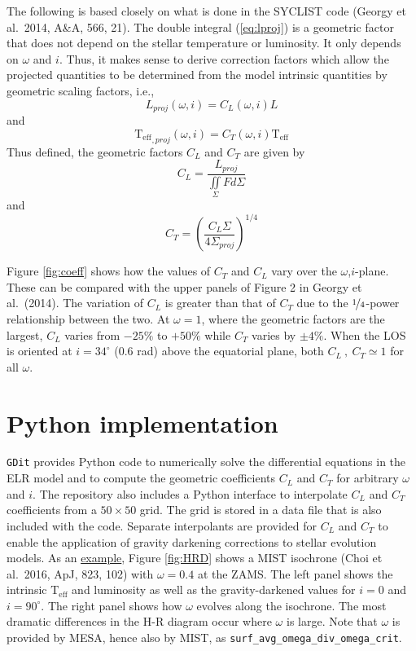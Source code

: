 \documentclass[12pt]{article}
\newcommand{\Teff}{\mathrm{T_{eff}}}
\begin{document}
The following is based closely on what is done in the SYCLIST code
(Georgy et al.\ 2014, A\&A, 566, 21). The double integral (\ref{eq:lproj}) is a
geometric factor that does not depend on the stellar temperature or luminosity.
It only depends on $\omega$ and $i$. Thus, it makes sense to derive correction
factors which allow the projected quantities to be determined from the model
intrinsic quantities by geometric scaling factors, i.e.,
\begin{equation}
  L_{proj}(\omega,i) = C_L(\omega,i) L
\end{equation}
and
\begin{equation}
  \Teff_{,proj}(\omega,i) = C_T(\omega,i) \Teff
\end{equation}
Thus defined, the geometric factors $C_L$ and $C_T$ are given by
\begin{equation}
C_L = \frac{L_{proj} }{\iint\limits_\Sigma F d\Sigma}
\end{equation}
and
\begin{equation}
C_T = \left( \frac{C_L \Sigma}{4 \Sigma_{proj}} \right)^{1/4}
\end{equation}

Figure \ref{fig:coeff} shows how the values of $C_T$ and $C_L$ vary over the
$\omega$,$i$-plane. These can be compared with the upper panels of Figure 2
in Georgy et al.\ (2014). The variation of $C_L$ is greater than that of $C_T$
due to the $\nicefrac{1}{4}$-power relationship between the two. At $\omega=1$, where
the geometric factors are the largest, $C_L$ varies from $-25\%$ to
$+50\%$ while $C_T$ varies by $\pm4\%$. When the LOS is oriented at
$i=34^{\circ}$ ($0.6$ rad) above the equatorial plane, both $C_L~,~C_T \simeq 1$
for all $\omega$.

\section{Python implementation}
\texttt{GDit} provides Python code to numerically solve the differential equations in the ELR model
and to compute the geometric coefficients $C_L$ and $C_T$ for arbitrary $\omega$ and $i$. The repository
also includes a Python interface to interpolate $C_L$ and $C_T$ coefficients from a $50\times50$ grid.
The grid is stored in a data file that is also included with the code. Separate interpolants are provided
for $C_L$ and $C_T$ to enable the application
of gravity darkening corrections to stellar evolution models.
As an \href{https://github.com/aarondotter/GDit/blob/master/example.py}{example}, Figure \ref{fig:HRD} shows
a MIST isochrone (Choi et al.\ 2016, ApJ, 823, 102) with $\omega=0.4$ at the ZAMS. The left panel shows
the intrinsic $\Teff$ and luminosity as well as the gravity-darkened values for $i=0$ and $i=90^{\circ}$.
The right panel shows how $\omega$ evolves along the isochrone. The most dramatic differences in the
H-R diagram occur where $\omega$ is large. Note that $\omega$ is provided by MESA, hence also by MIST,
as \texttt{surf\_avg\_omega\_div\_omega\_crit}.
\end{document}
